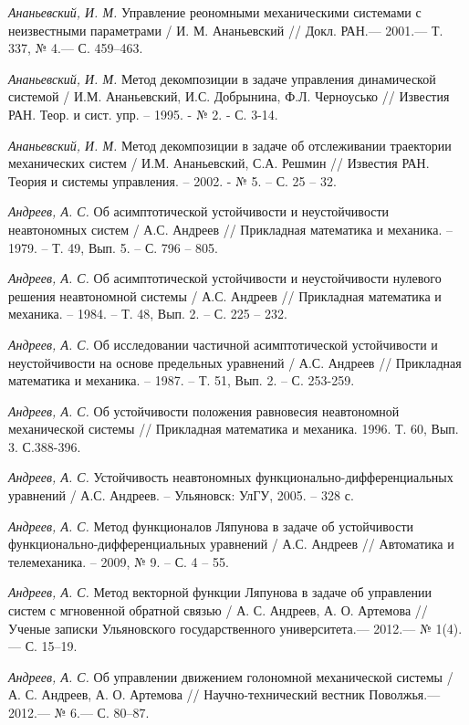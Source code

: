 \begin{thebibliography}{10}
	{\it Ананьевский, И. М.} Управление реономными механическими системами с неизвестными параметрами /
	И. М. Ананьевский // Докл. РАН.— 2001.— Т. 337, № 4.— С. 459–463.
	
	{\it Ананьевский, И. М.} Метод декомпозиции в задаче управления динамической системой / И.М. Ананьевский, И.С. Добрынина, Ф.Л. Черноусько // Известия РАН. Теор. и сист. упр. -- 1995. - № 2. - С. 3-14.
	
	{\it Ананьевский, И. М.} Метод декомпозиции в задаче об отслеживании траектории механических систем / И.М. Ананьевский, С.А. Решмин // Известия 	РАН. Теория и системы управления. – 2002. - № 5. – С. 25 – 32.
	
	{\it Андреев, А. С.} Об асимптотической устойчивости и неустойчивости неавтономных систем / А.С. Андреев // Прикладная математика и механика. – 	1979. – Т. 49, Вып. 5. – С. 		796 – 805.
	
	{\it Андреев, А. С.} Об асимптотической устойчивости и неустойчивости нулевого решения неавтономной системы / А.С. Андреев // Прикладная 		математика и механика. – 1984. – Т. 	48, Вып. 2. – С. 225 – 232.	
	
	{\it Андреев, А. С.} Об исследовании частичной асимптотической устойчивости и неустойчивости на основе предельных уравнений / А.С. Андреев // 		Прикладная математика и механика. – 1987. – Т. 51, Вып. 2. – С. 253-259.
	
	{\it Андреев, А. С.} Об устойчивости положения равновесия неавтономной механической
	системы // Прикладная математика и механика. 1996. Т. 60, Вып. 3. С.388-396.

	{\it Андреев, А. С.} Устойчивость неавтономных функционально-дифференциальных уравнений / А.С. Андреев. – Ульяновск: УлГУ, 2005. – 328 с.

	{\it Андреев, А. С.} Метод функционалов Ляпунова в задаче об устойчивости функционально-дифференциальных уравнений / А.С. Андреев // Автоматика 	и телемеханика. – 2009, № 9. – С. 4 – 55.

	{\it Андреев, А. С.} Метод векторной функции Ляпунова в задаче об управлении систем 	
	с мгновенной обратной связью / А. С. Андреев, А. О. Артемова // Ученые записки
	Ульяновского государственного университета.— 2012.— № 1(4).— С. 15–19.
	
	{\it Андреев, А. С.} Об управлении движением голономной механической системы / А. С. Андреев,
	А. О. Артемова // Научно-технический вестник Поволжья.— 2012.— № 6.— С. 80–87.


\end{thebibliography}
